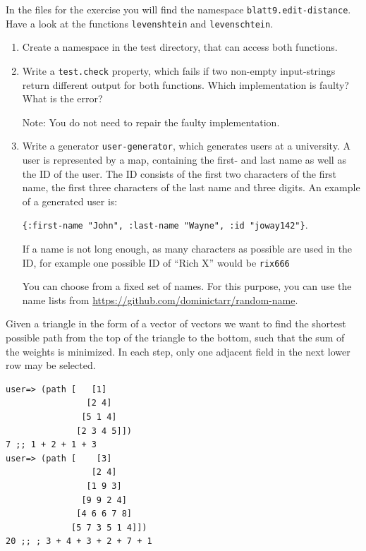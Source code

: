 \documentclass[11pt,a4paper]{article}
\begin{document}
\begin{exercise}

In the files for the exercise you will find the namespace \verb|blatt9.edit-distance|.
Have a look at the functions \verb|levenshtein| and \verb|levenschtein|.

\begin{enumerate}[label=\alph*)]
    \item
    	Create a namespace in the test directory,
    	that can access both functions.

    \item
    	Write a \verb|test.check| property,
        which fails if two non-empty
        input-strings return different output for both functions.
        Which implementation is faulty?
        What is the error?
        
        Note: You do not need to repair the faulty implementation.

    \item
    	Write a generator \verb|user-generator|, which generates users at a university.
        A user is represented by a map,
        containing the first- and last name as well as the ID of the user.
        The ID consists of the first two characters of the first name,
        the first three characters of the last name and three digits.
        An example of a generated user is:
        
        \verb|{:first-name "John", :last-name "Wayne", :id "joway142"}|.

		If a name is not long enough, as many characters as possible are used in the ID,
		for example one possible ID of \enquote{Rich X} would be \verb|rix666|


		You can choose from a fixed set of names.
        For this purpose, you can use the name lists from
        \url{https://github.com/dominictarr/random-name}.
\end{enumerate}
\end{exercise}

\begin{exercise}
Given a triangle in the form of a vector of vectors we want to find the shortest possible path from the top of the triangle to the bottom, such that the sum of the weights is minimized. In each step, only one adjacent field in the next lower row may be selected.

\enlargethispage{2\baselineskip}
\begin{verbatim}
user=> (path [   [1]
                [2 4]
               [5 1 4]
              [2 3 4 5]])
7 ;; 1 + 2 + 1 + 3
user=> (path [    [3]
                 [2 4]
                [1 9 3]
               [9 9 2 4]
              [4 6 6 7 8]
             [5 7 3 5 1 4]])
20 ;; ; 3 + 4 + 3 + 2 + 7 + 1

\end{verbatim}
\end{exercise}
\end{document}
